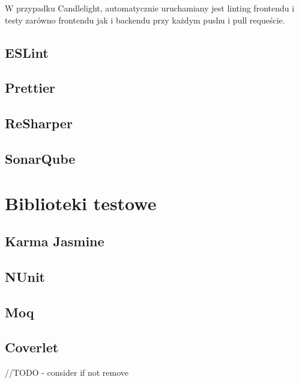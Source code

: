 \documentclass[a4paper,twoside,12pt]{book}
\begin{document}
W przypadku Candlelight, automatycznie uruchamiany jest linting frontendu i testy zarówno frontendu jak i backendu przy każdym pushu i pull requeście.

\cite{githubactions2025}

\subsection{ESLint}

\cite{eslintdocs2025}

\subsection{Prettier}

\cite{prettierdocs2025}

\subsection{ReSharper}

\cite{resharper2025}

\subsection{SonarQube}

\cite{sonarqube2025vs}

\section{Biblioteki testowe}

\subsection{Karma Jasmine}

\cite{karmarunner2025}

\subsection{NUnit}

\cite{nunit2025}

\subsection{Moq}

\cite{moqquickstart2025}

\subsection{Coverlet}
//TODO - consider if not remove
\cite{}
\end{document}
